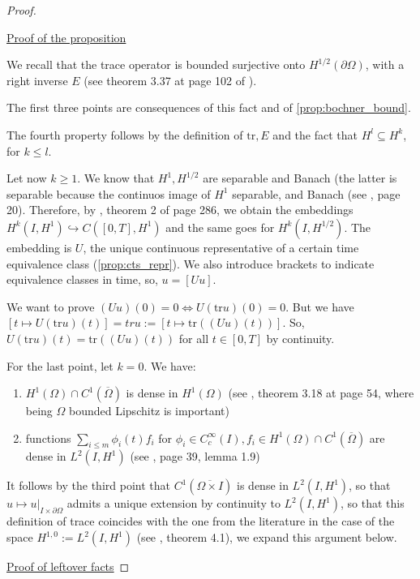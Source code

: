 \documentclass[english,a4paper,10pt,oneside]{scrbook}	%
\theoremstyle{break}
\newenvironment{mproof}[1][\proofname]{%
  \begin{proof}[#1]$ $\par\nobreak\ignorespaces
}{%
  \end{proof}
}
\renewcommand*{\proofname}{Proof}
\theoremstyle{remark}
\newcommand{\tr}{\text{tr}}
\newcommand{\emb}{\hookrightarrow}
\begin{document}
\begin{mproof}

\underline{Proof of the proposition}

We recall that the trace operator is bounded surjective onto $H^{1/2}(\partial \Omega)$, with a right inverse $E$ (see theorem 3.37 at page 102 of \cite{mclean}).

The first three points are consequences of this fact and of \cref{prop:bochner_bound}.

The fourth property follows by the definition of $\tr, E$ and the fact that $H^l\subseteq H^k$, for $k\leq l$.

Let now $k\geq 1$. We know that $H^1, H^{1/2}$ are separable and Banach (the latter is separable because the continuos image of $H^1$ separable, and Banach (see \cite{grisvard}, page 20). Therefore, by \cite{evans}, theorem 2 of page 286, we obtain the embeddings $H^k(I,H^1)\emb C([0,T],H^1)$ and the same goes for $H^k(I,H^{1/2})$. The embedding is $U$, the unique continuous representative of a certain time equivalence class (\cref{prop:cts_repr}). We also introduce brackets to indicate equivalence classes in time, so, $u = [Uu]$.

We want to prove $(Uu)(0)=0 \iff U(\tr u)(0)=0$. But we have $[t \mapsto U(\tr u )(t)]=tru:=[t \mapsto \tr((Uu)(t))]$. So, $U(\tr u )(t)=\tr((Uu)(t))$ for all $t\in[0,T]$ by continuity. 

For the last point, let $k=0$. We have:

\begin{enumerate}
\item $H^1(\Omega)\cap C^1(\overline{\Omega})$ is dense in $H^1(\Omega)$ (see \cite{adams}, theorem 3.18 at page 54, where being $\Omega$ bounded Lipschitz is important)
\item functions $\sum_{i\leq m} \phi_i(t)f_i$ for $\phi_i \in C_c^\infty(I), f_i \in H^1(\Omega)\cap C^1(\overline{\Omega})$ are dense in $L^2(I,H^1)$ (see \cite{hinze}, page 39, lemma 1.9)
\end{enumerate}

It follows by the third point that $C^1(\overline{\Omega\times I})$ is dense in $L^2(I,H^1)$, so that $u\mapsto u|_{I\times \partial \Omega}$ admits a unique extension by continuity to $L^2(I,H^1)$, so that this definition of trace coincides with the one from the literature in the case of the space $H^{1,0}:=L^2(I,H^1)$ (see \cite{lions}, theorem 4.1), we expand this argument below.

\underline{Proof of leftover facts}


\end{mproof}
\end{document}
